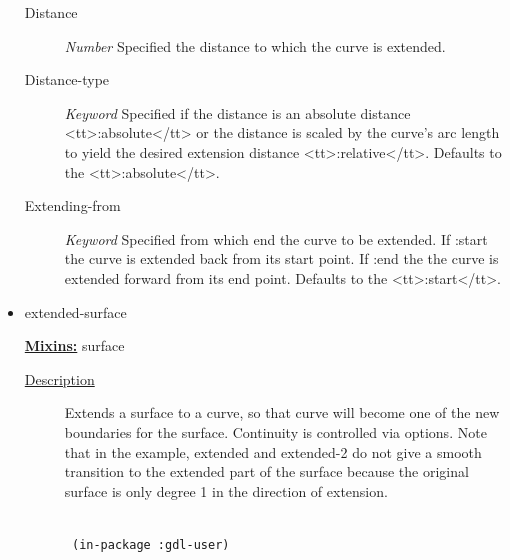 \documentclass [11pt]{book}
\begin{document}
\begin{itemize}
\begin{description}
\item [Distance]
\emph{Number} Specified the distance to which the curve is extended.


\item [Distance-type]
\emph{Keyword} Specified if the distance is an absolute distance <tt>:absolute</tt> or the distance is scaled by the curve's arc length
to yield the desired extension distance <tt>:relative</tt>. Defaults to the <tt>:absolute</tt>.


\item [Extending-from]
\emph{Keyword} Specified from which end the curve to be extended. If :start the curve is extended back from  its  start point.
If :end the the curve is extended forward from its end point. Defaults to the <tt>:start</tt>.


\end{description}







\item {}extended-surface


\textbf{
\underline{Mixins:}} surface





\begin{description}

\item [
\underline{Description}]


Extends a surface to a curve, so that curve will 
become one of the new boundaries for the surface. Continuity is controlled via
options. Note that in the example, extended and extended-2 do not give a smooth
transition to the extended part of the surface because the original surface
is only degree 1 in the direction of extension.



\end{description}




\begin{figure}
\begin{lrbox}{\boxedverb}
\begin{minipage}{\linewidth}
{\small

\begin{verbatim}

 (in-package :gdl-user)
                   

\end{verbatim}}
\end{minipage}
\end{lrbox}
\end{figure}
\end{itemize}
\end{document}

